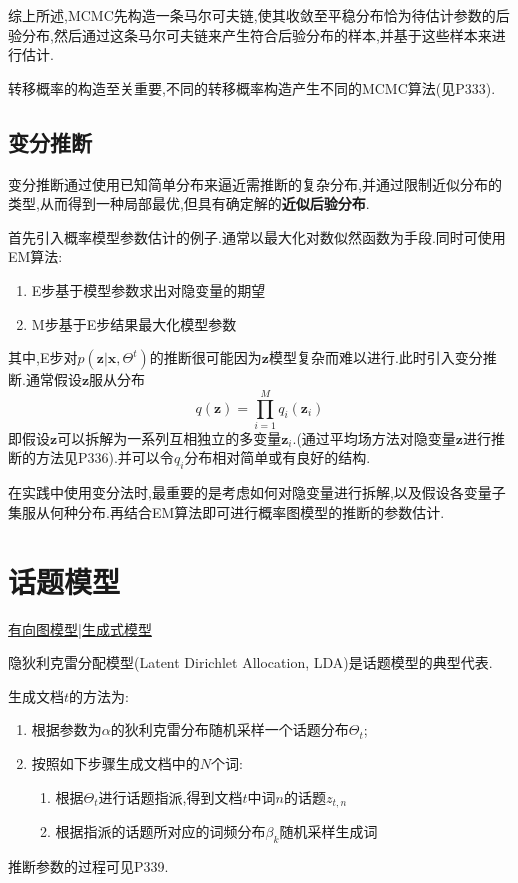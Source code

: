 综上所述,MCMC先构造一条马尔可夫链,使其收敛至平稳分布恰为待估计参数的后验分布,然后通过这条马尔可夫链来产生符合后验分布的样本,并基于这些样本来进行估计.

转移概率的构造至关重要,不同的转移概率构造产生不同的MCMC算法(见P333).

\subsection{变分推断}

变分推断通过使用已知简单分布来逼近需推断的复杂分布,并通过限制近似分布的类型,从而得到一种局部最优,但具有确定解的\textbf{近似后验分布}.

首先引入概率模型参数估计的例子.通常以最大化对数似然函数为手段.同时可使用EM算法:
\begin{enumerate}
\item E步基于模型参数求出对隐变量的期望
\item M步基于E步结果最大化模型参数
\end{enumerate}

其中,E步对$p(\bm z|\bm x, \Theta^t)$的推断很可能因为$\bm z$模型复杂而难以进行.此时引入变分推断.通常假设$\bm z$服从分布
\begin{equation}
q(\bm z)=\prod_{i=1}^Mq_i(\bm z_i)
\end{equation}
即假设$\bm z$可以拆解为一系列互相独立的多变量$\bm z_i$.(通过平均场方法对隐变量$\bm z$进行推断的方法见P336).并可以令$q_i$分布相对简单或有良好的结构.

在实践中使用变分法时,最重要的是考虑如何对隐变量进行拆解,以及假设各变量子集服从何种分布.再结合EM算法即可进行概率图模型的推断的参数估计.

\section{话题模型}
\underline{有向图模型|生成式模型}

隐狄利克雷分配模型(Latent Dirichlet Allocation, LDA)是话题模型的典型代表.

生成文档$t$的方法为:

\begin{enumerate}
\item 根据参数为$\alpha$的狄利克雷分布随机采样一个话题分布$\Theta_t$;
\item 按照如下步骤生成文档中的$N$个词:
    \begin{enumerate}
    \item 根据$\Theta_t$进行话题指派,得到文档$t$中词$n$的话题$z_{t,n}$
    \item 根据指派的话题所对应的词频分布$\beta_k$随机采样生成词
    \end{enumerate}
\end{enumerate}
推断参数的过程可见P339.

